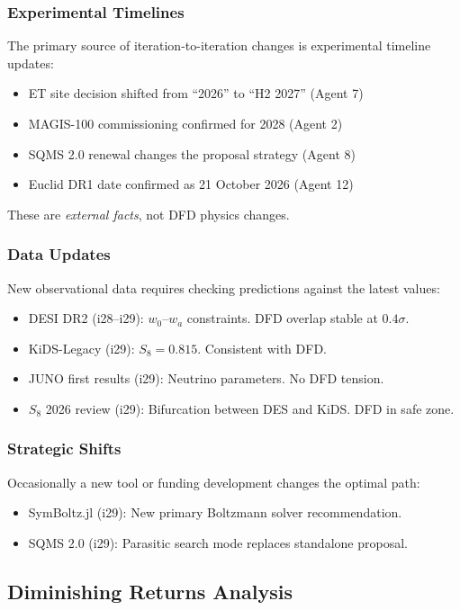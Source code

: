 \documentclass[11pt,a4paper]{article}
\begin{document}
\subsubsection{Experimental Timelines}
The primary source of iteration-to-iteration changes is experimental timeline updates:
\begin{itemize}
\item ET site decision shifted from ``2026'' to ``H2 2027'' (Agent 7)
\item MAGIS-100 commissioning confirmed for 2028 (Agent 2)
\item SQMS 2.0 renewal changes the proposal strategy (Agent 8)
\item Euclid DR1 date confirmed as 21 October 2026 (Agent 12)
\end{itemize}
These are \emph{external facts}, not DFD physics changes.

\subsubsection{Data Updates}
New observational data requires checking predictions against the latest values:
\begin{itemize}
\item DESI DR2 (i28--i29): $w_0$--$w_a$ constraints. DFD overlap stable at $0.4\sigma$.
\item KiDS-Legacy (i29): $S_8 = 0.815$. Consistent with DFD.
\item JUNO first results (i29): Neutrino parameters. No DFD tension.
\item $S_8$ 2026 review (i29): Bifurcation between DES and KiDS. DFD in safe zone.
\end{itemize}

\subsubsection{Strategic Shifts}
Occasionally a new tool or funding development changes the optimal path:
\begin{itemize}
\item SymBoltz.jl (i29): New primary Boltzmann solver recommendation.
\item SQMS 2.0 (i29): Parasitic search mode replaces standalone proposal.
\end{itemize}

\subsection{Diminishing Returns Analysis}
\end{document}
